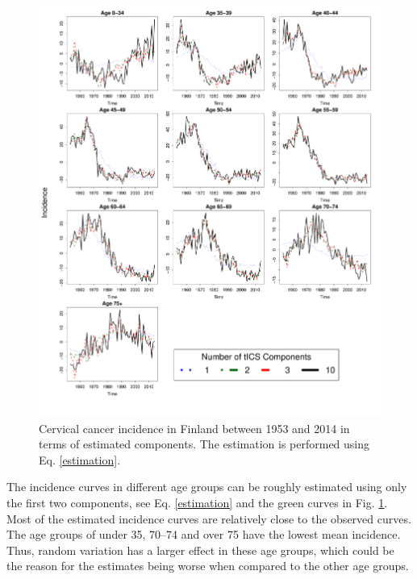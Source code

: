 \documentclass{llncs}
\begin{document}
\begin{figure}
     \centering
 \includegraphics[width=1\linewidth]{dimticsfinal.pdf}
     


     \caption{Cervical cancer incidence in Finland between 1953 and 2014 in terms of estimated components. The estimation is performed using Eq. \ref{estimation}.}
     \label{dimred}
\end{figure}



The incidence curves in different age groups can be roughly estimated using only the first two components, see Eq. \ref{estimation} and  the green curves in Fig. \ref{dimred}. Most of the estimated incidence curves are relatively close to the observed curves. The age groups of under 35, 70--74 and over 75 have the lowest mean incidence. Thus, random variation has a larger effect in these age groups, which could be the reason for the estimates being worse when compared to the other age groups.
\end{document}
